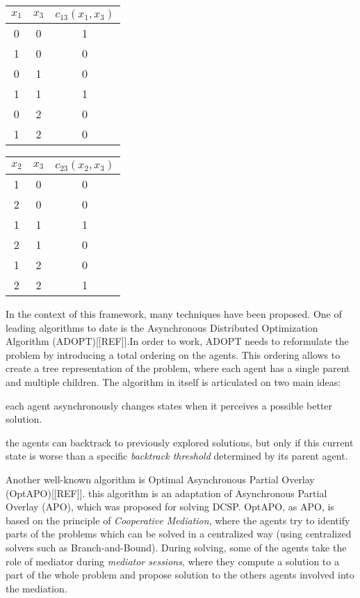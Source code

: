 \begin{center}
\begin{tabular}{ccc}
\textbf{$x_1$}	& \textbf{$x_3$} & \textbf{$c_{13}(x_1,x_3)$}\\
\hline
0   & 0	& 1\\
\hline
1   & 0	& 0\\
\hline
0   & 1	& 0\\
\hline
1   & 1	& 1\\
\hline
0   & 2	& 0\\
\hline
1   & 2	& 0\\
\end{tabular}
\quad
\begin{tabular}{ccc}
\textbf{$x_2$}	& \textbf{$x_3$} & \textbf{$c_{23}(x_2,x_3)$}\\
\hline
1   & 0	& 0\\
\hline
2   & 0	& 0\\
\hline
1   & 1	& 1\\
\hline
2   & 1	& 0\\
\hline
1   & 2	& 0\\
\hline
2   & 2	& 1\\
\end{tabular}
\end{center}

In the context of this framework, many techniques have been proposed. One of leading algorithms to date is the Asynchronous Distributed Optimization Algorithm (ADOPT)[[REF]].In order to work, ADOPT needs to reformulate the problem by introducing a total ordering on the agents. This ordering allows to create a tree representation of the problem, where each agent has a single parent and multiple children. The algorithm in itself is articulated on two main ideas:

\begin{compactitem}
\item each agent asynchronously changes states when it perceives a possible better solution.
\item the agents can backtrack to previously explored solutions, but only if this current state is worse than a specific \emph{backtrack threshold} determined by its parent agent.
\end{compactitem}

Another well-known algorithm is Optimal Asynchronous Partial Overlay (OptAPO)[[REF]]. this algorithm is an adaptation of Asynchronous Partial Overlay (APO), which was proposed for solving DCSP. OptAPO, as APO, is based on the principle of \emph{Cooperative Mediation}, where the agents try to identify parts of the problems which can be solved in a centralized way (using centralized solvers such as Branch-and-Bound). During solving, some of the agents take the role of mediator during \emph{mediator sessions}, where they compute a solution to a part of the whole problem and propose solution to the others agents involved into the mediation.

